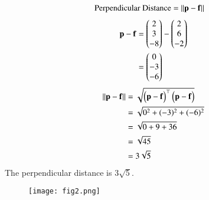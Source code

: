 \documentclass[journal]{IEEEtran}
\begin{document}
\begin{align}
\text{Perpendicular Distance} &= \left\lVert\mathbf{p}-\mathbf{f}\right\rVert
\end{align}
\begin{align}
\mathbf{p}-\mathbf{f} &= \begin{pmatrix}2 \\ 3 \\ -8\end{pmatrix} - \begin{pmatrix}2 \\ 6 \\ -2\end{pmatrix} \\
&=\begin{pmatrix}0 \\ -3 \\ -6\end{pmatrix}
\end{align}
\begin{align}
\left\lVert\mathbf{p}-\mathbf{f}\right\rVert &= \sqrt{\begin{pmatrix}\mathbf{p}-\mathbf{f}\end{pmatrix}^\top \begin{pmatrix}\mathbf{p}-\mathbf{f}\end{pmatrix}} \\
&= \sqrt{0^2 + (-3)^2 + (-6)^2} \\
&= \sqrt{0 + 9 + 36} \\
&= \sqrt{45} \\
&= 3\sqrt{5}
\end{align}
The perpendicular distance is $3\sqrt{5}$.
\begin{figure}[H]
\centering
\texttt{[image: fig2.png]}
\caption{}
\label{fig:1}
\end{figure}
\end{document}
